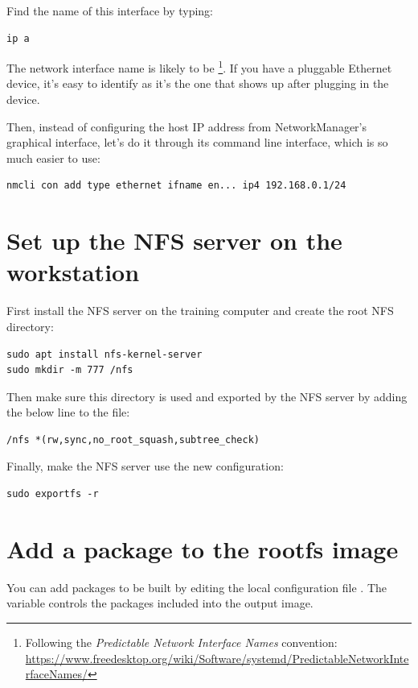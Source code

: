 Find the name of this interface by typing:
\begin{verbatim}
ip a
\end{verbatim}

The network interface name is likely to be
\footnote{Following the {\em Predictable Network Interface
Names} convention:
\url{https://www.freedesktop.org/wiki/Software/systemd/PredictableNetworkInterfaceNames/}}.
If you have a pluggable Ethernet device, it's easy to identify as it's
the one that shows up after plugging in the device.

Then, instead of configuring the host IP address from NetworkManager’s graphical interface,
let’s do it through its command line interface, which is so much easier to use:

\begin{verbatim}
nmcli con add type ethernet ifname en... ip4 192.168.0.1/24
\end{verbatim}

\section{Set up the NFS server on the workstation}

First install the NFS server on the training computer and create the root NFS
directory:
\begin{verbatim}
sudo apt install nfs-kernel-server
sudo mkdir -m 777 /nfs
\end{verbatim}

Then make sure this directory is used and exported by the NFS server by adding
the below line to the  file:

\begin{verbatim}
/nfs *(rw,sync,no_root_squash,subtree_check)
\end{verbatim}

Finally, make the NFS server use the new configuration:
\begin{verbatim}
sudo exportfs -r
\end{verbatim}

\section{Add a package to the rootfs image}

You can add packages to be built by editing the local configuration file
. The  variable controls the
packages included into the output image.

